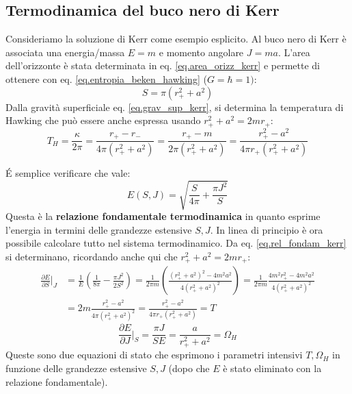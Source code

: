 \subsection{Termodinamica del buco nero di Kerr}
Consideriamo la soluzione di Kerr come esempio esplicito. Al buco nero di Kerr è associata una energia/massa $E= m$ e momento angolare $J=ma$. L'area dell'orizzonte è stata determinata in eq. \ref{eq.area_orizz_kerr} e permette di ottenere con eq. \ref{eq.entropia_beken_hawking} ($G=\hbar =1)$:
\begin{equation}
    S= \pi(r_+^2 + a^2)
    \label{eq.entropia_kerr}
\end{equation}
Dalla gravità superficiale eq. \ref{eq.grav_sup_kerr},  si determina la temperatura di Hawking che può essere anche espressa usando $r_+^2 + a^2 = 2mr_+$:
\begin{equation}
    T_H = \frac{\kappa}{2\pi} = \frac{r_+ - r_-}{4\pi(r_+^2 + a^2)}= \frac{r_+ - m}{2\pi(r_+^2 +a^2)} =\frac{r_+^2 - a^2}{4\pi r_+(r_+^2+a^2)}
    \label{eq.temp_kerr}
\end{equation}

\'E semplice verificare che vale:
\begin{equation}
    E(S,J) = \sqrt{\frac{S}{4\pi} + \frac{\pi J^2}{S}}
    \label{eq.rel_fondam_kerr}
\end{equation}
Questa è la \textbf{relazione fondamentale termodinamica} in quanto esprime l'energia in termini delle grandezze estensive $S, J$.
In linea di principio è ora possibile calcolare tutto nel sistema termodinamico. Da eq. \ref{eq.rel_fondam_kerr} si determinano, ricordando anche qui che $r_+^2 + a^2 =2mr_+$:
\begin{align*}
    \frac{\partial E}{\partial S}\Big|_J &= \frac{1}{E}\left( \frac{1}{8\pi} - \frac{\pi J^2}{2S^2}\right) =\frac{1}{2\pi m}\left( \frac{(r_+^2 + a^2)^2 - 4m^2a^2}{4(r_+^2+a^2)^2}\right) = \frac{1}{2\pi m}\frac{4m^2r_+^2 - 4m^2a^2}{4(r_+^2+a^2)^2} \\
  &= 2m \frac{r_+^2 - a^2}{4\pi(r_+^2 + a^2)^2}  = \frac{r_+^2 - a^2}{4\pi r_+(r_+^2 + a^2)} = T
\end{align*}
\begin{equation*}
    \frac{\partial E}{\partial J}\Big|_S = \frac{\pi J}{SE} = \frac{a}{r_+^2 + a^2} = \Omega_H
\end{equation*}
Queste sono due equazioni di stato che esprimono i parametri intensivi $T, \Omega_H$ in funzione delle grandezze estensive $S, J$ (dopo che $E$ è stato eliminato con la relazione fondamentale).


